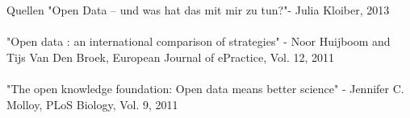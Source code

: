\begin{frame}[t]{Quellen}
"Open Data -- und was hat das mit mir zu tun?"- Julia Kloiber, 2013\\
~\\
"Open data : an international comparison of strategies"
- Noor Huijboom and Tijs Van Den Broek, European Journal of ePractice, Vol. 12, 2011\\
~\\
"The open knowledge foundation: Open data means better science"
- Jennifer C. Molloy, PLoS Biology, Vol. 9, 2011
\end{frame}

\nocite{*}


